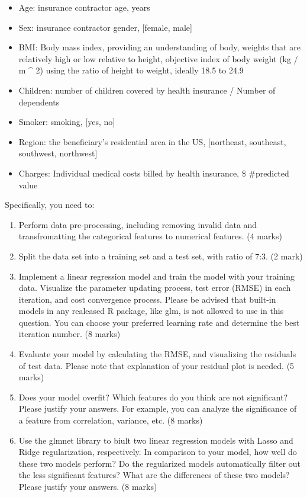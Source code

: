 \documentclass[
]{article}
\providecommand{\tightlist}{%
  \setlength{\itemsep}{0pt}\setlength{\parskip}{0pt}}
\begin{document}
\begin{itemize}
\tightlist
\item
  Age: insurance contractor age, years
\item
  Sex: insurance contractor gender, {[}female, male{]}
\item
  BMI: Body mass index, providing an understanding of body, weights that
  are relatively high or low relative to height, objective index of body
  weight (kg / m \^{} 2) using the ratio of height to weight, ideally
  18.5 to 24.9
\item
  Children: number of children covered by health insurance / Number of
  dependents
\item
  Smoker: smoking, {[}yes, no{]}
\item
  Region: the beneficiary's residential area in the US, {[}northeast,
  southeast, southwest, northwest{]}
\item
  Charges: Individual medical costs billed by health insurance, \$
  \#predicted value
\end{itemize}

Specifically, you need to:

\begin{enumerate}
\def\labelenumi{\arabic{enumi}.}
\tightlist
\item
  Perform data pre-processing, including removing invalid data and
  transfromatting the categorical features to numerical features. (4
  marks)
\item
  Split the data set into a training set and a test set, with ratio of
  7:3. (2 mark)
\item
  Implement a linear regression model and train the model with your
  training data. Visualize the parameter updating process, test error
  (RMSE) in each iteration, and cost convergence process. Please be
  advised that built-in models in any realeased R package, like glm, is
  not allowed to use in this question. You can choose your preferred
  learning rate and determine the best iteration number. (8 marks)
\item
  Evaluate your model by calculating the RMSE, and visualizing the
  residuals of test data. Please note that explanation of your residual
  plot is needed. (5 marks)
\item
  Does your model overfit? Which features do you think are not
  significant? Please justify your answers. For example, you can analyze
  the significance of a feature from correlation, variance, etc. (8
  marks)
\item
  Use the glmnet library to biult two linear regression models with
  Lasso and Ridge regularization, respectively. In comparison to your
  model, how well do these two models perform? Do the regularized models
  automatically filter out the less significant features? What are the
  differences of these two models? Please justify your answers. (8
  marks)
\end{enumerate}
\end{document}
